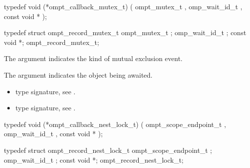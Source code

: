 \begin{ccppspecific}
\begin{omptCallback}
typedef void (*ompt_callback_mutex_t) (
  ompt_mutex_t ,
  omp_wait_id_t ,
  const void *
);
\end{omptCallback}
\end{ccppspecific}


\record

\begin{ccppspecific}
\begin{omptRecord}
typedef struct ompt_record_mutex_t {
  ompt_mutex_t ;
  omp_wait_id_t ;
  const void *;
} ompt_record_mutex_t;
\end{omptRecord}
\end{ccppspecific}


\argdesc

The argument  indicates the kind of mutual exclusion event.

The argument  indicates the object being awaited.

\codeptrdesc

\crossreferences
\begin{itemize}
\item {} type signature, see
.
\item {} type signature, see
.
\end{itemize}



\label{sec:ompt_callback_nest_lock_t}
\format

\begin{ccppspecific}
\begin{omptCallback}
typedef void (*ompt_callback_nest_lock_t) (
  ompt_scope_endpoint_t ,
  omp_wait_id_t ,
  const void *
);
\end{omptCallback}
\end{ccppspecific}


\record

\begin{ccppspecific}
\begin{omptRecord}
typedef struct ompt_record_nest_lock_t {
  ompt_scope_endpoint_t ;
  omp_wait_id_t ;
  const void *;
} ompt_record_nest_lock_t;
\end{omptRecord}
\end{ccppspecific}


